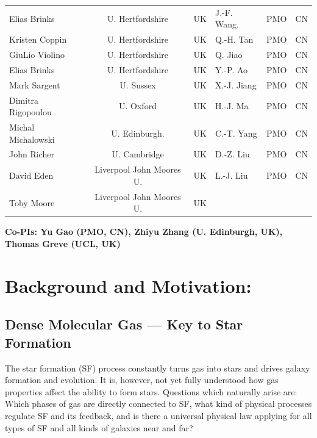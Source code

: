 \documentclass[legal,11pt]{article}
\begin{document}
\begin{table}[htbp]
\begin{threeparttable}[b]
\begin{tabular}{lcclcc}
Elias Brinks         & U. Hertfordshire  & UK & J.-F. Wang.       & PMO           & CN \\
Kristen Coppin       & U. Hertfordshire  & UK & Q.-H. Tan         & PMO           & CN \\
GiuLio Violino       & U. Hertfordshire  & UK & Q. Jiao           & PMO           & CN \\
Elias  Brinks        & U. Hertfordshire  & UK & Y.-P. Ao          & PMO           & CN  \\
Mark Sargent         & U. Sussex         & UK & X.-J. Jiang       & PMO           & CN \\
Dimitra Rigopoulou   & U. Oxford         & UK & H.-J. Ma          & PMO           & CN \\
Michal Michalowski   & U. Edinburgh.     & UK & C.-T. Yang        & PMO           & CN \\
John Richer          & U. Cambridge      & UK & D.-Z. Liu         & PMO           & CN \\ 
David Eden   & Liverpool John Moores U.  & UK & L.-J. Liu         & PMO           & CN \\
Toby Moore   & Liverpool John Moores U.  & UK &  & & \\

\hline
\end{tabular}
 
\begin{tablenotes}
{\bf Co-PIs: Yu Gao (PMO, CN), Zhiyu Zhang (U. Edinburgh, UK), Thomas Greve (UCL, UK)}\\
\end{tablenotes}
\end{threeparttable}

\end{table}



\clearpage
\justify
\medskip


\section{Background and Motivation:}

\subsection{Dense Molecular Gas --- Key to Star Formation }


The star formation (SF) process constantly turns gas into stars and drives 
galaxy formation and evolution. It is, however, not yet fully understood how 
gas properties affect the ability to form stars. Questions which naturally arise
are: Which phases of gas are directly connected to SF, what kind of physical
processes regulate SF and its feedback, and is there a universal physical law
applying for all types of SF and all kinds of galaxies near and far?   
\end{document}
